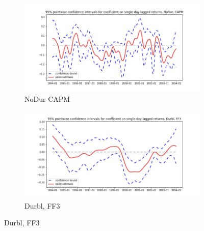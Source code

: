 \documentclass{article}
\begin{document}
    \begin{figure}
  \begin{subfigure}[b]{0.5\textwidth}
    \centering
    \includegraphics[width=\textwidth]{NoDur/pointwiseCIs_CAPM.jpg}
    \caption{NoDur CAPM}
    \label{fig:1}
  \end{subfigure}
  \begin{subfigure}[b]{0.5\textwidth}
    \centering
    \includegraphics[width=\textwidth]{Durbl/pointwiseCIs_FF3.jpg}
    \caption{Durbl, FF3}
    \label{fig:2}
  \end{subfigure}
  \end{figure}
  
\end{document}
